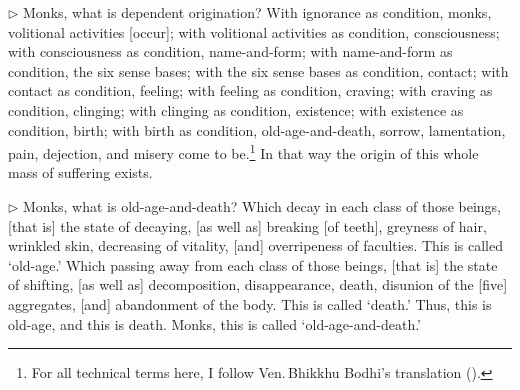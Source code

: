 \addtocounter{sennum}{-3}
$\triangleright$  Monks, what is dependent origination?  With ignorance as condition, monks, volitional activities [occur]; with volitional activities as condition, consciousness; with consciousness as condition, name-and-form; with name-and-form as condition, the six sense bases; with the six sense bases as condition, contact; with contact as condition, feeling; with feeling as condition, craving; with craving as condition, clinging; with clinging as condition, existence; with existence as condition, birth; with birth as condition, old-age-and-death, sorrow, lamentation, pain, dejection, and misery come to be.\footnote{For all technical terms here, I follow Ven.\,Bhikkhu Bodhi's translation (\citealp[pp.~294--5]{bodhi:reading}).}  In that way the origin of this whole mass of suffering exists.\\


\addtocounter{sennum}{-4}
$\triangleright$  Monks, what is old-age-and-death?  Which decay in each class of those beings, [that is] the state of decaying, [as well as] breaking [of teeth], greyness of hair, wrinkled skin, decreasing of vitality, [and] overripeness of faculties. This is called `old-age.'  Which passing away from each class of those beings, [that is] the state of shifting, [as well as] decomposition, disappearance, death, disunion of the [five] aggregates, [and] abandonment of the body. This is called `death.'  Thus, this is old-age, and this is death. Monks, this is called `old-age-and-death.'\\

